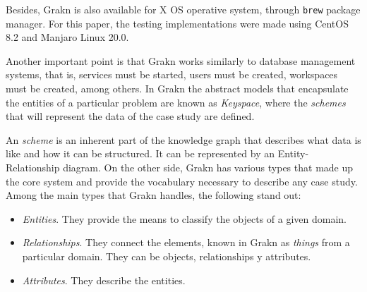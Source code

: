 Besides, Grakn is also available for X OS operative system,  through 
\texttt{brew} package manager. For this paper, the testing implementations 
were made using CentOS 8.2 and Manjaro Linux 20.0.

Another important point is that Grakn works similarly to database management 
systems, that is, services must be started, users must be created, workspaces 
must be created, among others. In Grakn the abstract models that encapsulate 
the entities of a particular problem are known as \textit{Keyspace}, where the 
\textit{schemes} that will represent the data of the case study are defined.

An \textit{scheme} is an inherent part of the knowledge graph that describes 
what data is like and how it can be structured. It can be represented by an 
Entity-Relationship diagram. On the other side, Grakn has various types that 
made up the core system and provide the vocabulary necessary to describe any 
case study. Among the main types that Grakn handles, the following stand out:

\begin{itemize}
    \item \textit{Entities}. They provide the means to classify the objects of 
    a given domain.
    \item \textit{Relationships}. They connect the elements, known in Grakn as 
        \textit{things} from a particular domain. They can be objects, 
        relationships y attributes.
    \item \textit{Attributes}. They describe the entities.
\end{itemize}

